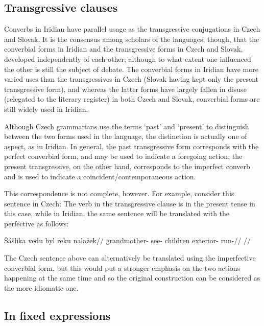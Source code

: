 \subsection{Transgressive clauses}

Converbs in Iridian have parallel usage as the transgressive conjugations in Czech and Slovak. It is the consensus among scholars of the languages, though, that the converbial forms in Iridian and the transgressive forms in Czech and Slovak, developed independently of each other; although to what extent one influenced the other is still the subject of debate. The converbial forms in Iridian have more varied uses than the transgressives in Czech (Slovak having kept only the present transgressive form), and whereas the latter forms have largely fallen in disuse (relegated to the literary register) in both Czech and Slovak, converbial forms are still widely used in Iridian.

Although Czech grammarians use the terms `past' and `present' to distinguish between the two forms used in the language, the distinction is actually one of aspect, as in Iridian. In general, the past transgressive form corresponds with the perfect converbial form, and may be used to indicate a foregoing action; the present transgressive, on the other hand, corresponds to the imperfect converb and is used to indicate a coincident/contemporaneous action.

This correspondence is not complete, however. For example, consider this sentence in Czech:  The verb in the transgressive clause is in the present tense in this case, while in Iridian, the same sentence will be translated with the perfective as follows:

\pex
\begingl
\gla \v{S}\'a\v{s}lika vedu byl reku nala\v{z}ek//
\glb grandmother- see- children exterior- run-//
\glft {}//
\endgl
\xe

The Czech sentence above can alternatively be translated using the imperfective converbial form, but this would put a stronger emphasis on the two actions happening at the same time and so the original construction can be considered as the more idiomatic one.

\subsection{In fixed expressions}

